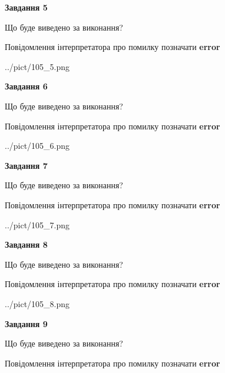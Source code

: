 \documentclass[11pt, ukrainian]{article}
\begin{document}
{\begin {large}
{\begin {center}\textbf{Завдання 5}\end {center}}\par
Що буде виведено за виконання? \par
Повідомлення інтерпретатора про помилку позначати \textbf{error}

\begin{center}
	{../pict/105_5.png}
\end{center}
\newpage

{\begin {center}\textbf{Завдання 6}\end {center}}\par
Що буде виведено за виконання? \par
Повідомлення інтерпретатора про помилку позначати \textbf{error}

\begin{center}
	{../pict/105_6.png}
\end{center}
\newpage

{\begin {center}\textbf{Завдання 7}\end {center}}\par
Що буде виведено за виконання? \par
Повідомлення інтерпретатора про помилку позначати \textbf{error}

\begin{center}
	{../pict/105_7.png}
\end{center}
\newpage

{\begin {center}\textbf{Завдання 8}\end {center}}\par
Що буде виведено за виконання? \par
Повідомлення інтерпретатора про помилку позначати \textbf{error}

\begin{center}
	{../pict/105_8.png}
\end{center}
\newpage

{\begin {center}\textbf{Завдання 9}\end {center}}\par
Що буде виведено за виконання? \par
Повідомлення інтерпретатора про помилку позначати \textbf{error}


\end{large}}
\end{document}
